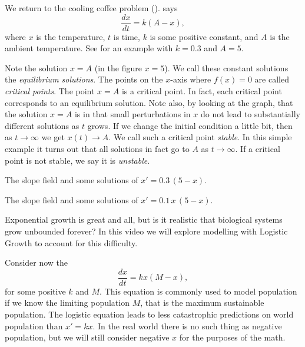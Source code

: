 We return to the cooling coffee problem
().
says
\begin{equation*}
\frac{dx}{dt} = k (A-x) ,
\end{equation*}
where $x$ is the temperature, $t$ is time, $k$ is some positive constant,
and $A$ is
the ambient temperature.  See  for an example
with $k=0.3$ and $A=5$.

Note the solution $x=A$ (in the figure $x=5$).
We call these constant solutions the
\emph{equilibrium solutions}.
The points on the $x$-axis where $f(x) = 0$ are called
\emph{critical points}.  The point
$x=A$ is a critical point.  In fact, each
critical point corresponds to an equilibrium solution.
Note also, by looking at the graph, that the solution $x=A$ is
 in
that small perturbations in $x$ do not lead to substantially different
solutions as $t$ grows.
If we change the initial condition a little bit, then as 
$t \to \infty$ we get $x(t) \to A$.  We call such a critical point
\emph{stable}.
In this simple example it turns out that all solutions in fact go to $A$
as $t \to \infty$.  If a critical point is not stable, we say it is
\emph{unstable}.

\begin{myfig}
\parbox[t]{3.0in}{
 \capstart
 \caption{The slope field and some solutions of
 $x' = 0.3\,(5-x)$.\label{2.2:coffeefig}}
}
\quad
\parbox[t]{3.0in}{
 \capstart
 \caption{The slope field and some solutions of
 $x' = 0.1\,x\,(5-x)$.\label{2.2:logisticfig}}
}
\end{myfig}

\medskip

\begin{video}
    Exponential growth is great and all, but is it realistic that biological systems grow unbounded forever? In this video we will explore modelling with Logistic Growth to account for this difficulty. 
\end{video}

Consider now the \emph{}
\begin{equation*}
\frac{dx}{dt} = kx(M-x) ,
\end{equation*}
for some positive $k$ and $M$.  This equation is commonly used to model
population if we know the limiting population $M$, that is the maximum
sustainable population.  The logistic equation leads to 
less catastrophic
predictions on world population than $x'=kx$.  In the real world there is no
such thing as negative population, but we will still consider negative $x$ for
the purposes of the math.

